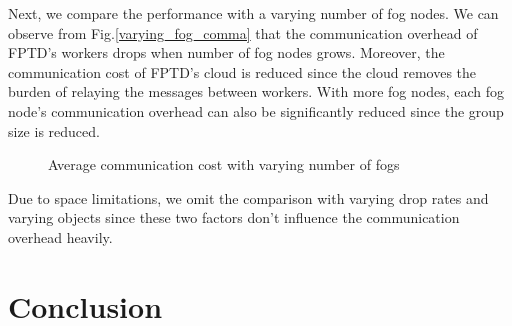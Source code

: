 \documentclass[conference,a4paper]{IEEEtran}
\begin{document}
    Next, we compare the performance with a varying number of fog nodes. We can observe from Fig.\ref{varying_fog_comma} that the communication overhead of FPTD's workers drops when number of fog nodes grows. Moreover, the communication cost of FPTD's cloud is reduced since the cloud removes the burden of relaying the messages between workers. With more fog nodes, each fog node's communication overhead can also be significantly reduced since the group size is reduced.
    \begin{figure}[!ht]
        \centering
        \caption{Average communication cost with varying number of fogs}
        \label{varying_fog_comm}
    \end{figure}

    Due to space limitations, we omit the comparison with varying drop rates and varying objects since these two factors don't influence the communication overhead heavily.

\section{Conclusion}\label{conclusion}
\end{document}
